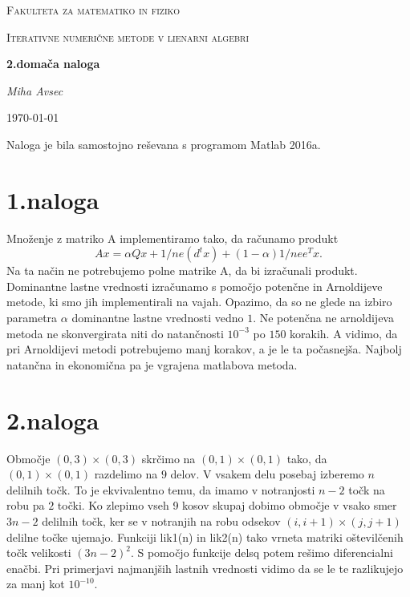 \documentclass[11pt]{article} %
\begin{document}
\begin{titlepage}
\centering
{\scshape\LARGE Fakulteta za matematiko in fiziko \par}
\vspace{1cm}
{\scshape\Large Iterativne numerične metode v lienarni algebri\par}
\vspace{1.5cm}
{\huge\bfseries 2.domača naloga\par}
\vspace{2cm}
{\Large\itshape Miha Avsec\par}
\vfill

\vfill

{\large \today\par}
\end{titlepage}

Naloga je bila samostojno reševana s programom Matlab 2016a.

\section{1.naloga}

Množenje z matriko A implementiramo tako, da računamo produkt
$$Ax = \alpha Qx + 1/ne(d^tx) + (1-\alpha)1/nee^{T}x.$$
Na ta način ne potrebujemo polne matrike A, da bi izračunali produkt. Dominantne lastne vrednosti izračunamo s pomočjo potenčne in Arnoldijeve metode, ki smo jih implementirali na vajah.
Opazimo, da so ne glede na izbiro parametra $\alpha$ dominantne lastne vrednosti vedno $1$. Ne potenčna ne arnoldijeva metoda ne skonvergirata niti do natančnosti $10^{-3}$ po $150$ korakih. A vidimo, da pri Arnoldijevi metodi potrebujemo manj korakov, a je le ta počasnejša. Najbolj natančna in ekonomična pa je vgrajena matlabova metoda.

\section{2.naloga}

Območje $(0,3)\times(0,3)$ skrčimo na $(0,1)\times(0,1)$ tako, da $(0,1)\times(0,1)$ razdelimo na $9$ delov. V vsakem delu posebaj izberemo $n$ delilnih točk. To je ekvivalentno temu, da imamo v notranjosti $n-2$ točk na robu pa $2$ točki. Ko zlepimo vseh 9 kosov skupaj dobimo območje v vsako smer $3n-2$ delilnih točk, ker se v notranjih na robu odsekov $(i,i+1)\times(j,j+1)$ delilne točke ujemajo. Funkciji lik1(n) in lik2(n) tako vrneta matriki oštevilčenih točk velikosti $(3n-2)^2$. S pomočjo funkcije delsq potem rešimo diferencialni enačbi. Pri primerjavi najmanjših lastnih vrednosti vidimo da se le te razlikujejo za manj kot $10^{-10}$.
\end{document}
